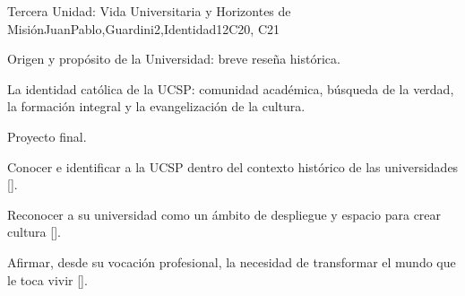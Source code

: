 \begin{syllabus}
\begin{unit}{}{Tercera Unidad: Vida Universitaria y Horizontes de Misión}{JuanPablo,Guardini2,Identidad}{12}{C20, C21}
\begin{topics}
	\item Origen y propósito de la Universidad: breve reseña histórica.
	\item La identidad católica de la UCSP: comunidad académica, búsqueda de la verdad, la formación integral y la  evangelización de la cultura.
	\item Proyecto final.
\end{topics}
\begin{learningoutcomes}
	\item Conocer e identificar  a la UCSP dentro del contexto histórico de las universidades [\Usage].
	\item Reconocer a su universidad como un ámbito de despliegue y espacio para crear cultura [\Usage].
    \item Afirmar, desde su vocación profesional, la necesidad de transformar el mundo que le toca vivir [\Usage].
\end{learningoutcomes}
\end{unit}



\begin{coursebibliography}
\end{coursebibliography}

\end{syllabus}
